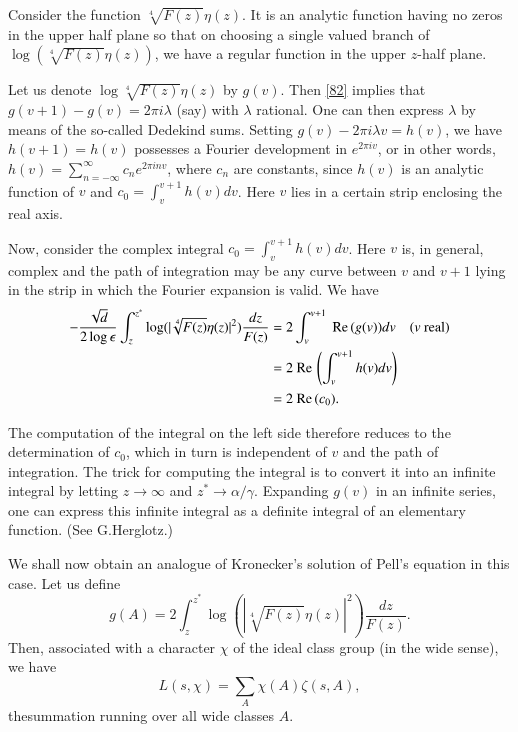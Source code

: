 Consider the function $\sqrt[4]{F(z)}\eta(z)$. It is an analytic
function having no zeros in the upper half plane so that on choosing a
single valued branch of\pageoriginale $\log(\sqrt[4]{F(z)}\eta(z))$,
we have a regular function in the upper $z$-half plane.

Let us denote $\log\sqrt[4]{F(z)}\eta(z)$ by $g(v)$. Then \eqref{82}
implies that $g(v+1)-g(v)=2\pi i\lambda$ (say) with $\lambda$
rational. One can then express $\lambda$ by means of the so-called
Dedekind sums. Setting $g(v)-2\pi i\lambda v=h(v)$, we have
$h(v+1)=h(v)$ possesses a Fourier development in $e^{2\pi iv}$, or in
other words, $h(v)=\sum\limits^{\infty}_{n=-\infty}c_{n}e^{2\pi inv}$,
where $c_{n}$ are constants, since $h(v)$ is an analytic function of
$v$ and $c_{0}=\int^{v+1}_{v}h(v)dv$. Here $v$ lies in a certain strip
enclosing the real axis.

Now, consider the complex integral $c_{0}=\int^{v+1}_{v}h(v)dv$. Here
$v$ is, in general, complex and the path of integration may be any
curve between $v$ and $v+1$ lying in the strip in which the Fourier
expansion is valid. We have
\begin{align*}
-\frac{\sqrt{d}}{2\log
  \epsilon}\int^{z^{\ast}}_{z}\log(|\sqrt[4]{F(z)}\eta(z)|^{2})\frac{dz}{F(z)}
&= 2\int^{v+1}_{v}\text{ Re\,}(g(v))dv\quad(v\text{ real})\\
&= 2 \text{ Re\,}\left(\int^{v+1}_{v}h(v)dv\right)\\
&= 2\text{ Re\,}(c_{0}).
\end{align*}

The computation of the integral on the left side therefore reduces to
the determination of $c_{0}$, which in turn is independent of $v$ and
the path of integration. The trick for computing the integral is to
convert it into an infinite integral by letting $z\to \infty$ and
$z^{\ast}\to \alpha/\gamma$. Expanding $g(v)$ in an infinite series,
one can express this infinite integral as a definite integral of an
elementary function. (See G.\@ Herglotz.)

We shall now obtain an analogue of Kronecker's solution of Pell's
equation in this case. Let us define
\begin{equation*}
g(A)=2\int^{z^{\ast}}_{z}\log(|\sqrt[4]{F(z)}\eta(z)|^{2})\frac{dz}{F(z)}.\tag{83}\label{83} 
\end{equation*}
Then, associated with a character $\chi$ of the ideal class group (in
the wide sense), we have
$$
L(s,\chi)=\sum_{A}\chi(A)\zeta(s,A),
$$
the\pageoriginale summation running over all wide classes $A$.

